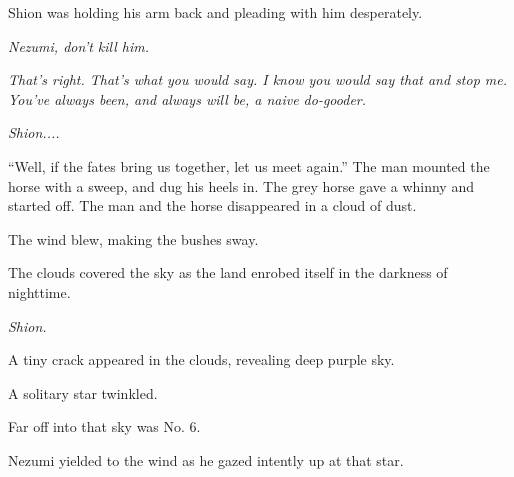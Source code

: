 Shion was holding his arm back and pleading with him desperately.

\emph{Nezumi, don't kill him.}

\myspace

\emph{That's right. That's what you would say. I know you would say that and
stop me. You've always been, and always will be, a naive do-gooder.}

\emph{Shion....}

``Well, if the fates bring us together, let us meet again.'' The man
mounted the horse with a sweep, and dug his heels in. The grey horse
gave a whinny and started off. The man and the horse disappeared in a
cloud of dust.

The wind blew, making the bushes sway.

The clouds covered the sky as the land enrobed itself in the
darkness of nighttime.

\emph{Shion.}

A tiny crack appeared in the clouds, revealing deep purple sky.

A solitary star twinkled.

Far off into that sky was No. 6.

Nezumi yielded to the wind as he gazed intently up at that star.